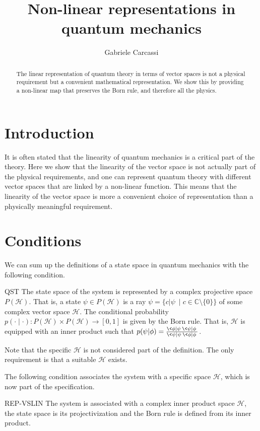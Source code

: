 \documentclass{techbrief}
\title{Non-linear representations in quantum mechanics}
\author{Gabriele Carcassi}
\begin{document}
	
\maketitle
	
\begin{abstract}
	The linear representation of quantum theory in terms of vector spaces is not a physical requirement but a convenient mathematical representation. We show this by providing a non-linear map that preserves the Born rule, and therefore all the physics.
\end{abstract}

\section{Introduction}

It is often stated that the linearity of quantum mechanics is a critical part of the theory. Here we show that the linearity of the vector space is not actually part of the physical requirements, and one can represent quantum theory with different vector spaces that are linked by a non-linear function. This means that the linearity of the vector space is more a convenient choice of representation than a physically meaningful requirement.

\section{Conditions}

We can sum up the definitions of a state space in quantum mechanics with the following condition.
\begin{condition}{QST}
	The state space of the system is represented by a complex projective space $P(\mathcal{H})$. That is, a state $\psi \in P(\mathcal{H})$ is a ray $\psi = \{c |\psi\> \mid c \in \mathbb{C} \setminus \{ 0\} \}$ of some complex vector space $\mathcal{H}$. The conditional probability $p( \cdot \mid \cdot) : P(\mathcal{H}) \times P(\mathcal{H}) \to [0,1]$ is given by the Born rule. That is, $\mathcal{H}$ is equipped with an inner product such that $p(\psi|\phi) = \frac{\< \phi | \psi \>\< \psi | \phi \>}{\< \psi | \psi \>\< \phi | \phi \>}$.
\end{condition}
Note that the specific $\mathcal{H}$ is not considered part of the definition. The only requirement is that a suitable $\mathcal{H}$ exists.

The following condition associates the system with a specific space $\mathcal{H}$, which is now part of the specification.
\begin{condition}{REP-VSLIN}
	The system is associated with a complex inner product space $\mathcal{H}$, the state space is its projectivization and the Born rule is defined from its inner product.
\end{condition}
\end{document}
